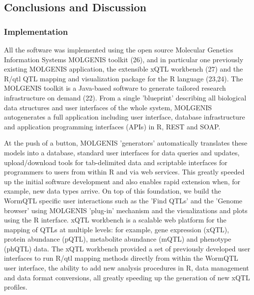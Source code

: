 \subsection{Conclusions and Discussion}
\subsubsection{Implementation}
All the software was implemented using the open source Molecular Genetics Information Systems 
MOLGENIS toolkit (26), and in particular one previously existing MOLGENIS application, the 
extensible xQTL workbench (27) and the R/qtl QTL mapping and visualization package for the R 
language (23,24). The MOLGENIS toolkit is a Java-based software to generate tailored research 
infrastructure on demand (22). From a single 'blueprint' describing all biological data 
structures and user interfaces of the whole system, MOLGENIS autogenerates a full application 
including user interface, database infrastructure and application programming interfaces 
(APIs) in R, REST and SOAP.

At the push of a button, MOLGENIS 'generators' automatically translates these models into a 
database, standard user interfaces for data queries and updates, upload/download tools for 
tab-delimited data and scriptable interfaces for programmers to users from within R and via 
web services. This greatly speeded up the initial software development and also enables rapid 
extension when, for example, new data types arrive. On top of this foundation, we build the 
WormQTL specific user interactions such as the 'Find QTLs' and the 'Genome browser' using 
MOLGENIS 'plug-in' mechanism and the visualizations and plots using the R interface. xQTL 
workbench is a scalable web platform for the mapping of QTLs at multiple levels: for example, 
gene expression (xQTL), protein abundance (pQTL), metabolite abundance (mQTL) and phenotype 
(phQTL) data. The xQTL workbench provided a set of previously developed user interfaces to 
run R/qtl mapping methods directly from within the WormQTL user interface, the ability to 
add new analysis procedures in R, data management and data format conversions, all greatly 
speeding up the generation of new xQTL profiles.

